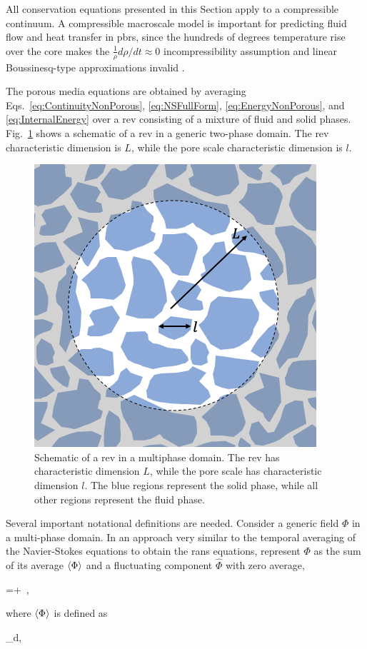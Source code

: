 All conservation equations presented in this Section apply to a compressible continuum. A compressible macroscale model is important for predicting fluid flow and heat transfer in \glspl{pbr}, since the hundreds of degrees temperature rise over the core makes the \(\frac{1}{\rho}d\rho/dt\approx0\) incompressibility assumption and linear Boussinesq-type approximations invalid \cite{elmo}. 

The porous media equations are obtained by averaging Eqs.\ \eqref{eq:ContinuityNonPorous}, \eqref{eq:NSFullForm}, \eqref{eq:EnergyNonPorous}, and \eqref{eq:InternalEnergy} over a \gls{rev} consisting of a mixture of fluid and solid phases. Fig.\ \ref{fig:rev} shows a schematic of a \gls{rev} in a generic two-phase domain. The \gls{rev} characteristic dimension is \(L\), while the pore scale characteristic dimension is \(l\).

\begin{figure}[!h]
\centering
\includegraphics[width=0.4\linewidth]{figs/rev.png}
\caption{Schematic of a \gls{rev} in a multiphase domain. The \gls{rev} has characteristic dimension \(L\), while the pore scale has characteristic dimension \(l\). The blue regions represent the solid phase, while all other regions represent the fluid phase.}
\label{fig:rev}
\end{figure}

Several important notational definitions are needed. Consider a generic field \(\Phi\) in a multi-phase domain. In an approach very similar to the temporal averaging of the Navier-Stokes equations to obtain the \gls{rans} equations, represent \(\Phi\) as the sum of its average \(\langle\Phi\rangle\) and a fluctuating component \(\hat{\Phi}\) with zero average,

\beq
\label{eq:PM_back}
\Phi=\la\Phi\ra+\hat{\Phi}\ ,
\eeq

\noindent where \(\langle\Phi\rangle\) is defined as

\beq
\label{eq:AverageDef}
\la\Phi\ra\equiv{}\int_{\volume}\Phi d\volume ,
\eeq

